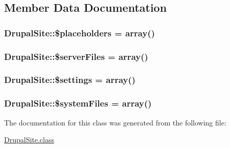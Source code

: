 \subsection{Member Data Documentation}
\hypertarget{classDrupalSite_a37624cd207b1d019f87c02d22ed245e0}{
\subsubsection[{\$placeholders}]{\setlength{\rightskip}{0pt plus 5cm}Drupal\-Site\-::\$placeholders = array()\hspace{0.3cm}{\ttfamily [private]}}}\label{classDrupalSite_a37624cd207b1d019f87c02d22ed245e0}
\hypertarget{classDrupalSite_a7640e2992d474dafa15b5764456816b8}{
\subsubsection[{\$server\-Files}]{\setlength{\rightskip}{0pt plus 5cm}Drupal\-Site\-::\$server\-Files = array()\hspace{0.3cm}{\ttfamily [private]}}}\label{classDrupalSite_a7640e2992d474dafa15b5764456816b8}
\hypertarget{classDrupalSite_aa68deb563e47389d18801a7b65aba1b4}{
\subsubsection[{\$settings}]{\setlength{\rightskip}{0pt plus 5cm}Drupal\-Site\-::\$settings = array()\hspace{0.3cm}{\ttfamily [private]}}}\label{classDrupalSite_aa68deb563e47389d18801a7b65aba1b4}
\hypertarget{classDrupalSite_a0ad106122ccf08f1b9ba547159018ba2}{
\subsubsection[{\$system\-Files}]{\setlength{\rightskip}{0pt plus 5cm}Drupal\-Site\-::\$system\-Files = array()\hspace{0.3cm}{\ttfamily [private]}}}\label{classDrupalSite_a0ad106122ccf08f1b9ba547159018ba2}


The documentation for this class was generated from the following file\-:\begin{DoxyCompactItemize}
\item 
\hyperlink{DrupalSite_8class}{Drupal\-Site.\-class}\end{DoxyCompactItemize}
